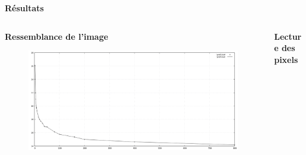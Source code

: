 \documentclass{beamer}
\begin{document}
\begin{frame}[t]
\begin{columns}[t]
\begin{column}{.5\linewidth}
\begin{block}{\centering \textbf{Résultats}}
                    \vspace{.5em}
                \end{block}

                \vspace{1em}
            \end{column}
        \end{columns}


        \begin{columns}[t]


            \begin{column}{.5\linewidth}
                \begin{block}{\centering \textbf{Ressemblance de l'image}}
                    \vspace{.5em}

                    \begin{center}
                        \begin{figure}[t]
                            \includegraphics[width=.6\linewidth]{rsc/psnr_ressemblance.png}
                        \end{figure}
                    \end{center}
                \end{block}
            \end{column}


            \begin{column}{.5\linewidth}
                \begin{block}{\centering \textbf{Lecture des pixels}}
                    \vspace{.5em}


\end{block}
\end{column}
\end{columns}
\end{frame}
\end{document}
